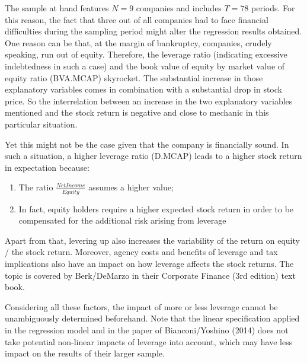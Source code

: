 \documentclass[a4paper]{article}
\begin{document}
The sample at hand features $N=9$ companies and includes $T=78$ periods. For this reason, the fact that three out of all companies had to face financial difficulties during the sampling period might alter the regression results obtained. One reason can be that, at the margin of bankruptcy, companies, crudely speaking, run out of equity. Therefore, the leverage ratio (indicating excessive indebtedness in such a case) and the book value of equity by market value of equity ratio (BVA.MCAP) skyrocket. The substantial increase in those explanatory variables comes in combination with a substantial drop in stock price. So the interrelation between an increase in the two explanatory variables mentioned and the stock return is negative and close to mechanic in this particular situation. 

Yet this might not be the case given that the company is financially sound. In such a situation, a higher leverage ratio (D.MCAP) leads to a higher stock return in expectation because: 

\begin{enumerate}
\item	The ratio $\frac{Net Income}{Equity}$ assumes a higher value;
\item In fact, equity holders require a higher expected stock return in order to be compensated for the additional risk arising from leverage
\end{enumerate}

Apart from that, levering up also increases the variability of the return on equity / the stock return. Moreover, agency costs and benefits of leverage and tax implications also have an impact on how leverage affects the stock returns. The topic is covered by Berk/DeMarzo in their Corporate Finance (3rd edition) text book.

Considering all these factors, the impact of more or less leverage cannot be unambiguously determined beforehand. Note that the linear specification applied in the regression model and in the paper of Bianconi/Yoshino (2014) does not take potential non-linear impacts of leverage into account, which may have less impact on the results of their larger sample.
\end{document}
